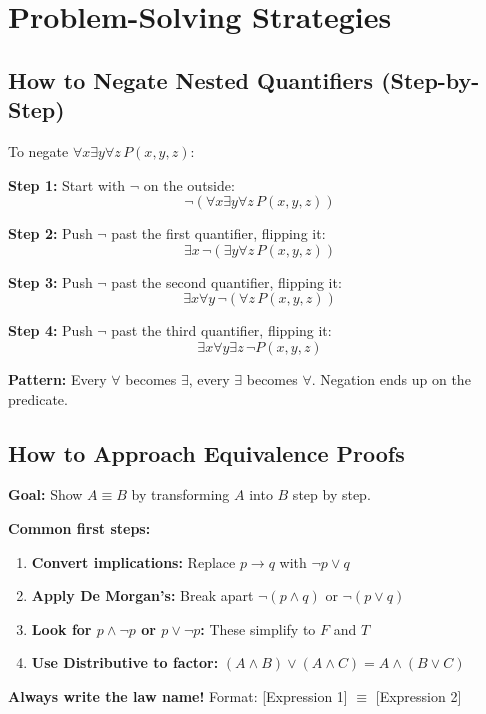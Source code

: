 \documentclass[11pt,a4paper]{article}
\begin{document}

\section{Problem-Solving Strategies}

\subsection{How to Negate Nested Quantifiers (Step-by-Step)}

\begin{tipbox}
To negate $\forall x \exists y \forall z\, P(x,y,z)$:

\textbf{Step 1:} Start with $\neg$ on the outside:
$$\neg(\forall x \exists y \forall z\, P(x,y,z))$$

\textbf{Step 2:} Push $\neg$ past the first quantifier, flipping it:
$$\exists x\, \neg(\exists y \forall z\, P(x,y,z))$$

\textbf{Step 3:} Push $\neg$ past the second quantifier, flipping it:
$$\exists x \forall y\, \neg(\forall z\, P(x,y,z))$$

\textbf{Step 4:} Push $\neg$ past the third quantifier, flipping it:
$$\exists x \forall y \exists z\, \neg P(x,y,z)$$

\textbf{Pattern:} Every $\forall$ becomes $\exists$, every $\exists$ becomes $\forall$. Negation ends up on the predicate.
\end{tipbox}

\subsection{How to Approach Equivalence Proofs}

\begin{tipbox}
\textbf{Goal:} Show $A \equiv B$ by transforming $A$ into $B$ step by step.

\textbf{Common first steps:}
\begin{enumerate}[noitemsep]
    \item \textbf{Convert implications:} Replace $p \to q$ with $\neg p \lor q$
    \item \textbf{Apply De Morgan's:} Break apart $\neg(p \land q)$ or $\neg(p \lor q)$
    \item \textbf{Look for $p \land \neg p$ or $p \lor \neg p$:} These simplify to $F$ and $T$
    \item \textbf{Use Distributive to factor:} $(A \land B) \lor (A \land C) = A \land (B \lor C)$
\end{enumerate}

\textbf{Always write the law name!} Format: [Expression 1] $\equiv$ [Expression 2] 
\end{tipbox}
\end{document}
